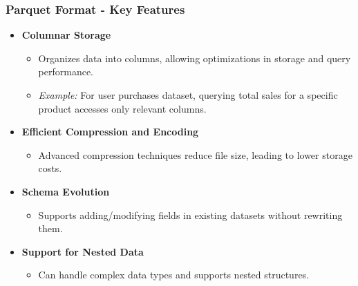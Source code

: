 \documentclass[aspectratio=169]{beamer}
\begin{document}
\begin{frame}[fragile]
    \frametitle{Parquet Format - Key Features}
    \begin{itemize}
        \item \textbf{Columnar Storage}
        \begin{itemize}
            \item Organizes data into columns, allowing optimizations in storage and query performance.
            \item \textit{Example:} For user purchases dataset, querying total sales for a specific product accesses only relevant columns.
        \end{itemize}
        
        \item \textbf{Efficient Compression and Encoding}
        \begin{itemize}
            \item Advanced compression techniques reduce file size, leading to lower storage costs.
        \end{itemize}

        \item \textbf{Schema Evolution}
        \begin{itemize}
            \item Supports adding/modifying fields in existing datasets without rewriting them.
        \end{itemize}

        \item \textbf{Support for Nested Data}
        \begin{itemize}
            \item Can handle complex data types and supports nested structures.
        \end{itemize}
    \end{itemize}
\end{frame}
\end{document}
